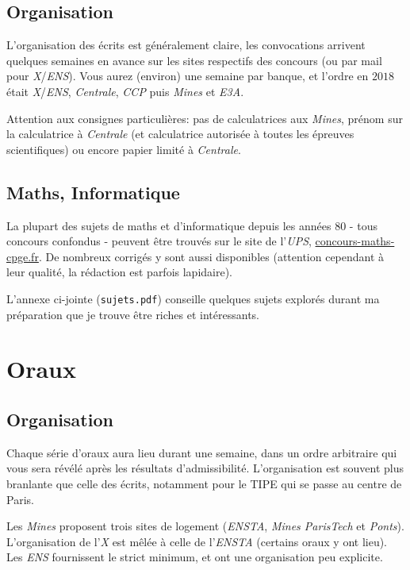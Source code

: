 \documentclass{article}
\begin{document}
\subsection{Organisation}
L'organisation des écrits est généralement claire, les convocations arrivent quelques semaines en avance sur les sites respectifs des concours (ou par mail pour \textit{X}/\textit{ENS}).
Vous aurez (environ) une semaine par banque, et l'ordre en $2018$ était \textit{X}/\textit{ENS}, \textit{Centrale}, \textit{CCP} puis \textit{Mines} et \textit{E3A}.

Attention aux consignes particulières: pas de calculatrices aux \textit{Mines}, prénom sur la calculatrice à \textit{Centrale} (et calculatrice autorisée à toutes les épreuves scientifiques) ou encore papier limité à \textit{Centrale}.

\subsection{Maths, Informatique}
La plupart des sujets de maths et d'informatique depuis les années $80$ - tous concours confondus - peuvent être trouvés sur le site de l'\textit{UPS}, \href{https://concours-maths-cpge.fr/}{concours-maths-cpge.fr}.
De nombreux corrigés y sont aussi disponibles (attention cependant à leur qualité, la rédaction est parfois lapidaire).

L'annexe ci-jointe (\texttt{sujets.pdf}) conseille quelques sujets explorés durant ma préparation que je trouve être riches et intéressants.

\section{Oraux}
\subsection{Organisation}
Chaque série d'oraux aura lieu durant une semaine, dans un ordre arbitraire qui vous sera révélé après les résultats d'admissibilité.
L'organisation est souvent plus branlante que celle des écrits, notamment pour le TIPE qui se passe au centre de Paris.

Les \textit{Mines} proposent trois sites de logement (\textit{ENSTA}, \textit{Mines ParisTech} et \textit{Ponts}).
L'organisation de l'\textit{X} est mêlée à celle de l'\textit{ENSTA} (certains oraux y ont lieu).
Les \textit{ENS} fournissent le strict minimum, et ont une organisation peu explicite.
\end{document}
